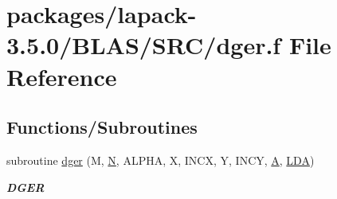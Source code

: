 \hypertarget{lapack-3_85_80_2BLAS_2SRC_2dger_8f}{}\section{packages/lapack-\/3.5.0/\+B\+L\+A\+S/\+S\+R\+C/dger.f File Reference}
\label{lapack-3_85_80_2BLAS_2SRC_2dger_8f}
\subsection*{Functions/\+Subroutines}
\begin{DoxyCompactItemize}
\item 
subroutine \hyperlink{group__double__blas__level2_ga458222e01b4d348e9b52b9343d52f828}{dger} (M, \hyperlink{polmisc_8c_a0240ac851181b84ac374872dc5434ee4}{N}, A\+L\+P\+H\+A, X, I\+N\+C\+X, Y, I\+N\+C\+Y, \hyperlink{classA}{A}, \hyperlink{example__user_8c_ae946da542ce0db94dced19b2ecefd1aa}{L\+D\+A})
\begin{DoxyCompactList}\small\item\em {\bfseries D\+G\+E\+R} \end{DoxyCompactList}\end{DoxyCompactItemize}
